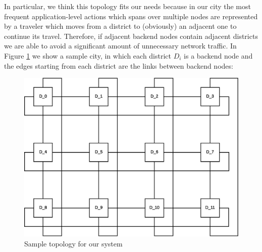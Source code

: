 In particular, we think this topology fits our needs because in our city the
most frequent application-level actions which spans over multiple nodes are
represented by a traveler which moves from a district to (obviously) an
adjacent one to continue its travel.
Therefore, if adjacent backend nodes contain adjacent districts we are able to
avoid a significant amount of unnecessary network traffic. In Figure
\ref{fig:sd-sys-arch-topology} we show a sample city, in which each district
$D_i$ is a backend node and the edges starting from each district are the links
between backend nodes:

\begin{figure}[H]
  \centering
  \includegraphics[scale=0.5,keepaspectratio]
    {images/solution/topology.eps}
  \caption{Sample topology for our system}
  \label{fig:sd-sys-arch-topology}
\end{figure}
